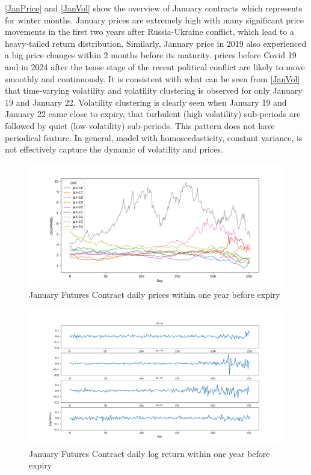 \documentclass[12pt,a4paper]{article}
\newcommand\colorAutoref[1]{{\hypersetup{linkcolor=black}\autoref{#1}}}
\numberwithin{equation}{section}
\begin{document}
\colorAutoref{JanPrice} and \colorAutoref{JanVol} show the overview of January contracts which represents for winter months. January prices are extremely high with many significant price movements in the first two years after Russia-Ukraine conflict, which lead to a heavy-tailed return distribution. Similarly, January price in 2019 also experienced a big price changes within 2 months before its maturity. prices before Covid 19 and in 2024 after the tense stage of the recent political conflict are likely to move smoothly and continuously. It is consistent with what can be seen from \colorAutoref{JanVol} that time-varying volatility and volatility clustering is observed for only January 19 and January 22. Volatility clustering is clearly seen when January 19 and January 22 came close to expiry, that turbulent (high volatility) sub-periods are followed by quiet (low-volatility) sub-periods. This pattern does not have periodical feature. In general, model with homoscedasticity, constant variance, is not effectively capture the dynamic of volatility and prices.

\begin{figure}[h!] 
\includegraphics[scale=1,width=1\linewidth,height=0.4\textheight]{Jan_price.png}
\caption{January Futures Contract daily prices within one year before expiry}
\label{JanPrice}
\end{figure}
\begin{figure}[h!] 
\includegraphics[scale=1,width=1\linewidth,height=0.4\textheight]{Jan_vol.png}
\caption{January Futures Contract daily log return within one year before expiry}
\label{JanVol}
\end{figure}
\end{document}
